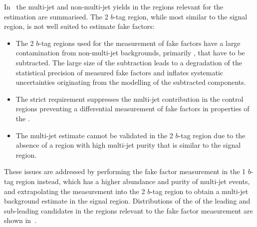 In~ the multi-jet and non-multi-jet yields in
the regions relevant for the \faketauhadvis estimation are
summarised. The 2 $b$-tag region, while most similar to the signal
region, is not well suited to estimate fake factors:
\begin{itemize}

\item The 2 $b$-tag regions used for the measurement of fake factors
  have a large contamination from non-multi-jet backgrounds, primarily
  \ttbarFakes, that have to be subtracted. The large size of the
  subtraction leads to a degradation of the statistical precision of
  measured fake factors and inflates systematic uncertainties
  originating from the modelling of the subtracted components.

\item The strict \btag requirement suppresses the multi-jet
  contribution in the control regions preventing a differential
  measurement of fake factors in properties of the \tauhadvis.

\item The multi-jet estimate cannot be validated in the 2 $b$-tag
  region due to the absence of a region with high multi-jet purity
  that is similar to the signal region.

\end{itemize}
These issues are addressed by performing the fake factor measurement
in the 1 $b$-tag region instead, which has a higher abundance and
purity of multi-jet events, and extrapolating the measurement into the
2 $b$-tag region to obtain a multi-jet background estimate in the
signal region. Distributions of the \pT of the leading and sub-leading
\tauhadvis candidates in the regions relevant to the fake factor
measurement are shown in~.

